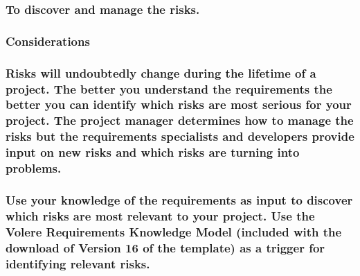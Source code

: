 \documentclass[
]{article}
\begin{document}
\hypertarget{to-discover-and-manage-the-risks.}{%
\subsubsection{To discover and manage the
risks.}\label{to-discover-and-manage-the-risks.}}

\hypertarget{considerations-54}{%
\subsubsection{Considerations}\label{considerations-54}}

\hypertarget{risks-will-undoubtedly-change-during-the-lifetime-of-a-project.-the-better-you-understand-the-requirements-the-better-you-can-identify-which-risks-are-most-serious-for-your-project.-the-project-manager-determines-how-to-manage-the-risks-but-the-requirements-specialists-and-developers-provide-input-on-new-risks-and-which-risks-are-turning-into-problems.}{%
\subsubsection{\texorpdfstring{Risks will undoubtedly change during the
lifetime of a project. The better you understand the requirements the
better you can identify which risks are most serious for your project.
The project manager determines how to manage the risks but the
requirements specialists and developers provide input on new risks and
which risks are turning into problems.
}{Risks will undoubtedly change during the lifetime of a project. The better you understand the requirements the better you can identify which risks are most serious for your project. The project manager determines how to manage the risks but the requirements specialists and developers provide input on new risks and which risks are turning into problems. }}\label{risks-will-undoubtedly-change-during-the-lifetime-of-a-project.-the-better-you-understand-the-requirements-the-better-you-can-identify-which-risks-are-most-serious-for-your-project.-the-project-manager-determines-how-to-manage-the-risks-but-the-requirements-specialists-and-developers-provide-input-on-new-risks-and-which-risks-are-turning-into-problems.}}

\hypertarget{use-your-knowledge-of-the-requirements-as-input-to-discover-which-risks-are-most-relevant-to-your-project.-use-the-volere-requirements-knowledge-model-included-with-the-download-of-version-16-of-the-template-as-a-trigger-for-identifying-relevant-risks.}{%
\subsubsection{Use your knowledge of the requirements as input to
discover which risks are most relevant to your project. Use the Volere
Requirements Knowledge Model (included with the download of Version 16
of the template) as a trigger for identifying relevant
risks.}\label{use-your-knowledge-of-the-requirements-as-input-to-discover-which-risks-are-most-relevant-to-your-project.-use-the-volere-requirements-knowledge-model-included-with-the-download-of-version-16-of-the-template-as-a-trigger-for-identifying-relevant-risks.}}
\end{document}
